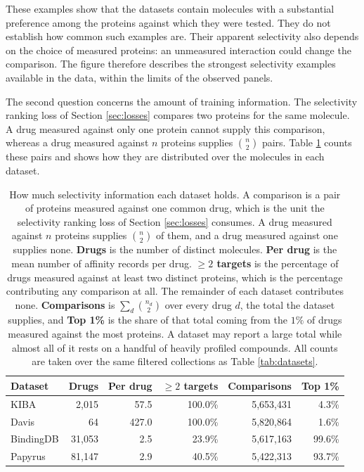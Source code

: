 \documentclass[a4paper,12pt]{article}
\begin{document}
These examples show that the datasets contain molecules with a substantial preference among the proteins against which they were tested. They do not establish how common such examples are. Their apparent selectivity also depends on the choice of measured proteins: an unmeasured interaction could change the comparison. The figure therefore describes the strongest selectivity examples available in the data, within the limits of the observed panels.

The second question concerns the amount of training information. The selectivity ranking loss of Section \ref{sec:losses} compares two proteins for the same molecule. A drug measured against only one protein cannot supply this comparison, whereas a drug measured against $n$ proteins supplies $\binom{n}{2}$ pairs. Table \ref{tab:selectivity_supply} counts these pairs and shows how they are distributed over the molecules in each dataset.

\begin{table}[H]
    \centering
    \caption[Selectivity examples available in each dataset.]{How much
        selectivity information each dataset holds. A comparison is a pair of proteins
        measured against one common drug, which is the unit the selectivity ranking loss of
        Section \ref{sec:losses} consumes. A drug measured against $n$ proteins supplies
        $\binom{n}{2}$ of them, and a drug measured against one supplies none.
        \textbf{Drugs} is the number of distinct molecules. \textbf{Per drug} is the mean number
        of affinity records per drug. \textbf{$\geq 2$ targets} is the percentage of drugs
        measured against at least two distinct proteins, which is the percentage contributing any
        comparison at all. The remainder of each dataset contributes none.
        \textbf{Comparisons} is $\sum_d \binom{n_d}{2}$ over every drug $d$, the total the
        dataset supplies, and \textbf{Top 1\%} is the share of that total coming from the $1\%$ of
        drugs measured against the most proteins. A dataset may report a large total while almost
        all of it rests on a handful of heavily profiled compounds. All counts are taken over the
        same filtered collections as Table \ref{tab:datasets}.}
    \label{tab:selectivity_supply}
    \begin{tabular}{lrrrrr}
        \toprule
        \textbf{Dataset} & \textbf{Drugs} & \textbf{Per drug} &
        \textbf{$\geq 2$ targets} & \textbf{Comparisons} & \textbf{Top 1\%} \\
        \midrule
        KIBA      &  2,015 &  57.5 & 100.0\% & 5,653,431 &  4.3\% \\
        Davis     &     64 & 427.0 & 100.0\% & 5,820,864 &  1.6\% \\
        BindingDB & 31,053 &   2.5 &  23.9\% & 5,617,163 & 99.6\% \\
        Papyrus   & 81,147 &   2.9 &  40.5\% & 5,422,313 & 93.7\% \\
        \bottomrule
    \end{tabular}
\end{table}
\end{document}

